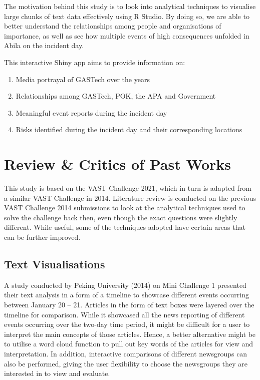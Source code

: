 \documentclass{acm_proc_article-sp}
\providecommand{\tightlist}{%
  \setlength{\itemsep}{0pt}\setlength{\parskip}{0pt}}
\begin{document}
The motivation behind this study is to look into analytical techniques
to visualise large chunks of text data effectively using R Studio. By
doing so, we are able to better understand the relationships among
people and organisations of importance, as well as see how multiple
events of high consequences unfolded in Abila on the incident day.

This interactive Shiny app aims to provide information on:

\begin{enumerate}
\def\labelenumi{\arabic{enumi}.}
\tightlist
\item
  Media portrayal of GASTech over the years
\item
  Relationships among GASTech, POK, the APA and Government
\item
  Meaningful event reports during the incident day
\item
  Risks identified during the incident day and their corresponding
  locations
\end{enumerate}

\hypertarget{review-critics-of-past-works}{%
\section{Review \& Critics of Past
Works}\label{review-critics-of-past-works}}

This study is based on the VAST Challenge 2021, which in turn is adapted
from a similar VAST Challenge in 2014. Literature review is conducted on
the previous VAST Challenge 2014 submissions to look at the analytical
techniques used to solve the challenge back then, even though the exact
questions were slightly different. While useful, some of the techniques
adopted have certain areas that can be further improved.

\hypertarget{text-visualisations}{%
\subsection{Text Visualisations}\label{text-visualisations}}

A study conducted by Peking University (2014) on Mini Challenge 1
presented their text analysis in a form of a timeline to showcase
different events occurring between January 20 -- 21. Articles in the
form of text boxes were layered over the timeline for comparison. While
it showcased all the news reporting of different events occurring over
the two-day time period, it might be difficult for a user to interpret
the main concepts of those articles. Hence, a better alternative might
be to utilise a word cloud function to pull out key words of the
articles for view and interpretation. In addition, interactive
comparisons of different newsgroups can also be performed, giving the
user flexibility to choose the newsgroups they are interested in to view
and evaluate.
\end{document}

